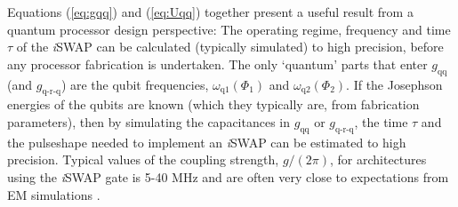\documentclass[aip,apr,twocolumn,showpacs,superscriptaddress,groupedaddress,nofootinbib,reprint]{revtex4-1}  %
\newcommand{\iSWAP}{\emph{i}\textsf{SWAP}}
\begin{document}
Equations (\ref{eq:gqq}) and (\ref{eq:Uqq}) together present a useful result from a quantum processor design perspective: The operating regime, frequency and time $\tau$ of the \iSWAP{} can be calculated (typically simulated) to high precision, before any processor fabrication is undertaken. The only `quantum' parts that enter $g_\text{qq}$ (and $g_\text{q-r-q}$) are the qubit frequencies, $\omega_{\text{q}1}(\Phi_1)$ and $\omega_{\text{q}2}(\Phi_2)$. If the Josephson energies of the qubits are known (which they typically are, from fabrication parameters), then by simulating the capacitances in $g_\text{qq}$ or $g_\text{q-r-q}$, the time $\tau$ and the pulseshape needed to implement an \iSWAP{} can be estimated to high precision. Typical values of the coupling strength, $g/(2\pi)$, for architectures using the \iSWAP{} gate is 5-40 MHz and are often very close to expectations from EM simulations \cite{Bialczak2010,Dewes2012,Salathe2015,Casparis2018a}.
\end{document}
